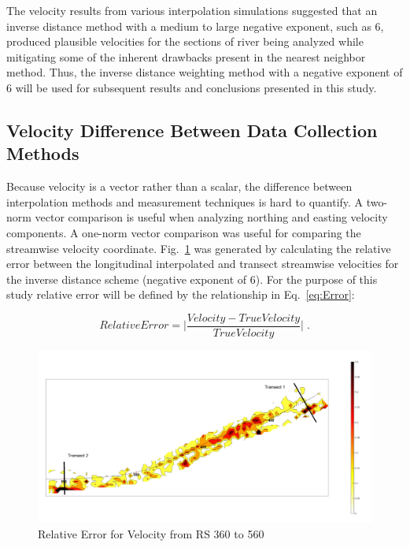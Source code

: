 \documentclass[Journal,letterpaper,BackFigs]{ascelike-new}
\begin{document}
The velocity results from various interpolation simulations suggested that an inverse distance method with a medium to large negative exponent, such as 6, produced plausible velocities for the sections of river being analyzed while mitigating some of the inherent drawbacks present in the nearest neighbor method. Thus, the inverse distance weighting method with a negative exponent of 6 will be used for subsequent results and conclusions presented in this study.

\subsection{Velocity Difference Between Data Collection Methods}
Because velocity is a vector rather than a scalar, the difference between interpolation methods and measurement techniques is hard to quantify. A two-norm vector comparison is useful when analyzing northing and easting velocity components. A one-norm vector comparison was useful for comparing the streamwise velocity coordinate. Fig.~\ref{fig:ErrorMap} was generated by calculating the relative error between the longitudinal interpolated and transect streamwise velocities for the inverse distance scheme (negative exponent of 6). For the purpose of this study relative error will be defined by the relationship in Eq.~\ref{eq:Error}:

\begin{equation} \label{eq:Error}
Relative Error =  \lvert \frac{Velocity - TrueVelocity}{TrueVelocity}\rvert\;.
\end{equation}

\begin{figure}
\centering
\includegraphics[width=\textwidth]{ErrorMap.pdf}
\caption{Relative Error for Velocity from RS 360 to 560}
\label{fig:ErrorMap}
\end{figure}
\end{document}
